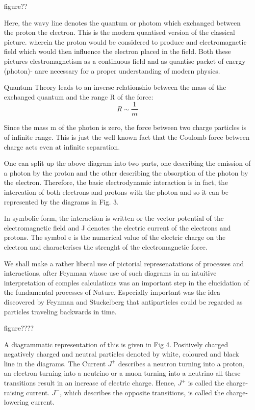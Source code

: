 figure??


Here, the wavy line denotes the quantum or photom which exchanged between the proton the electron. This is the modern quantised version of the classical picture. wherein the proton would be considered to produce and electromagnetic field which would then influence the electron placed in the field. Both these pictures elestromagnetism as a continuous field and as quantise packet of energy (photon)- anre necessary for a proper understanding of modern physics.

Quantum Theory leads to an inverse relationshio between the mass of the exchanged quantum and the range R of the force:
$$
R \sim \frac{1}{m}
$$

Since the mass m of the photon is zero, the force between two charge particles is of infinite range. This is just the well known fact that the Coulomb force between charge acts even at infinite separation.

One can split up the above diagram into two parts, one describing the emission of a photon by the proton and the other describing the absorption of the photon by the electron. Therefore, the basic electrodynamic interaction is in fact, the intercation of both electrons and protons with the photon and so it can be represented by the diagrams in Fig. 3.

In symbolic form, the interaction is written or the vector potential of the electromagnetic field and J denotes the electric current of the electrons and protons. The symbol e is the numerical value of the electric charge on the electron and characterises the strenght of the electromagnetic force.

We shall make a rather liberal use of pictorial represenatations of processes and interactions, after Feynman whose use of such diagrams in an intuitive interpretation of comples calculations was an important step in the elucidation of the fundamental processes of Nature. Especially important was the idea discovered by Feynman and Stuckelberg that antiparticles could be regarded as particles traveling backwards in time.

figure????

A diagrammatic representation of this is given in Fig 4. Positively charged negatively charged and neutral particles denoted by white, coloured and black line in the diagrams. The Current $J^{+}$ describes a neutron turning into a proton, an electron turning into a neutrino or a muon turning into a neutrino all these transitions result in an increase of electric charge. Hence, $J^{+}$ is called the charge-raising current. $J^{-}$, which describes the opposite transitions, is called the charge-lowering current.

